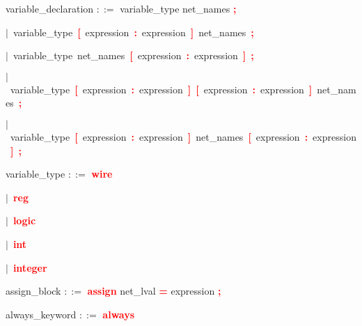 \vspace{1em}
\noindent
\settowidth{\parindent}{\hspace{4ex}}
variable\_declaration $::=$\hspace{1ex} variable\_type net\_names \textbf{\textcolor{red}{;}}

\mbox{$|$ variable\_type \textbf{\textcolor{red}{[}} expression \textbf{\textcolor{red}{:}} expression \textbf{\textcolor{red}{]}} net\_names \textbf{\textcolor{red}{;}}}

\mbox{$|$ variable\_type net\_names \textbf{\textcolor{red}{[}} expression \textbf{\textcolor{red}{:}} expression \textbf{\textcolor{red}{]}} \textbf{\textcolor{red}{;}}}

\mbox{$|$ variable\_type \textbf{\textcolor{red}{[}} expression \textbf{\textcolor{red}{:}} expression \textbf{\textcolor{red}{]}} \textbf{\textcolor{red}{[}} expression \textbf{\textcolor{red}{:}} expression \textbf{\textcolor{red}{]}} net\_names \textbf{\textcolor{red}{;}}}

\mbox{$|$ variable\_type \textbf{\textcolor{red}{[}} expression \textbf{\textcolor{red}{:}} expression \textbf{\textcolor{red}{]}} net\_names \textbf{\textcolor{red}{[}} expression \textbf{\textcolor{red}{:}} expression \textbf{\textcolor{red}{]}} \textbf{\textcolor{red}{;}}}

\vspace{1em}
\noindent
\settowidth{\parindent}{\hspace{4ex}}
variable\_type $::=$\hspace{1ex} \textbf{\textcolor{red}{wire}}

\mbox{$|$ \textbf{\textcolor{red}{reg}}}

\mbox{$|$ \textbf{\textcolor{red}{logic}}}

\mbox{$|$ \textbf{\textcolor{red}{int}}}

\mbox{$|$ \textbf{\textcolor{red}{integer}}}

\vspace{1em}
\noindent
\settowidth{\parindent}{\hspace{4ex}}
assign\_block $::=$\hspace{1ex} \textbf{\textcolor{red}{assign}} net\_lval \textbf{\textcolor{red}{=}} expression \textbf{\textcolor{red}{;}}

\vspace{1em}
\noindent
\settowidth{\parindent}{\hspace{4ex}}
always\_keyword $::=$\hspace{1ex} \textbf{\textcolor{red}{always}}

